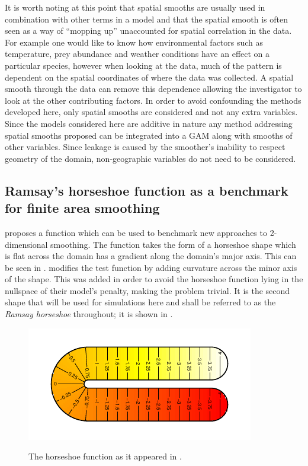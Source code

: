 It is worth noting at this point that spatial smooths are usually used in combination with other terms in a model and that the spatial smooth is often seen as a way of ``mopping up'' unaccounted for spatial correlation in the data. For example one would like to know how environmental factors such as temperature, prey abundance and weather conditions have an effect on a particular species, however when looking at the data, much of the pattern is dependent on the spatial coordinates of where the data was collected. A spatial smooth through the data can remove this dependence allowing the investigator to look at the other contributing factors. In order to avoid confounding the methods developed here, only spatial smooths are considered and not any extra variables. Since the models considered here are additive in nature any method addressing spatial smooths proposed can be integrated into a GAM along with smooths of other variables. Since leakage is caused by the smoother's inability to respect geometry of the domain, non-geographic variables do not need to be considered.

\subsection{Ramsay's horseshoe function as a benchmark for finite area smoothing}

\label{ramsayfunc}

 proposes a function which can be used to benchmark new approaches to 2-dimensional smoothing. The function takes the form of a horseshoe shape which is flat across the domain has a gradient along the domain's major axis. This can be seen in .  modifies the test function by adding curvature across the minor axis of the shape. This was added in order to avoid the horseshoe function lying in the nullspace of their model's penalty, making the problem trivial. It is the second shape that will be used for simulations here and shall be referred to as the \emph{Ramsay horseshoe} throughout; it is shown in .

\begin{figure}
\centering
\includegraphics{intro/figs/orig-fs.pdf}\\
\caption{The horseshoe function as it appeared in .}
\label{orig-fs}
\end{figure}

